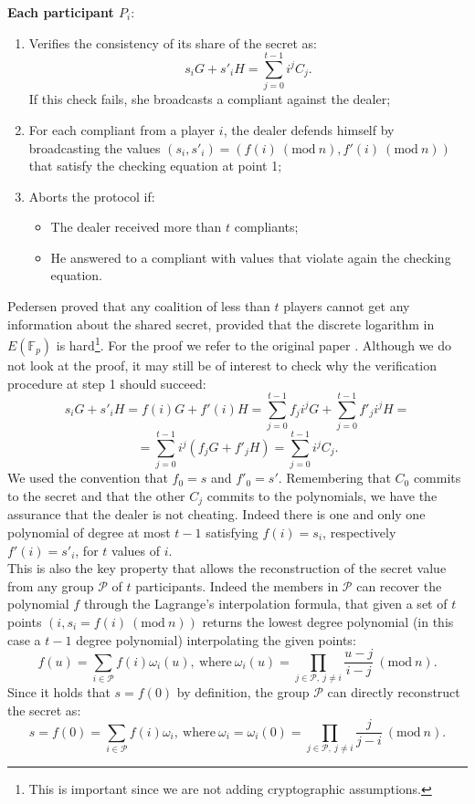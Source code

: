 \bigskip

\noindent
{\bf Each participant $P_i$}:
\begin{enumerate}
	\item Verifies the consistency of its share of the secret as:
	$$s_iG + s'_iH = \sum_{j = 0}^{t - 1}i^jC_j.$$
	If this check fails, she broadcasts a compliant against the dealer;
	\item For each compliant from a player $i$, the dealer defends himself by broadcasting the values $(s_i, s'_i) = (f(i) \ (\text{mod} \ n), f'(i) \ (\text{mod} \ n))$ that satisfy the checking equation at point 1;
	\item Aborts the protocol if:
	\begin{itemize}
		\item The dealer received more than $t$ compliants;
		\item He answered to a compliant with values that violate again the checking equation.
	\end{itemize}
\end{enumerate}
Pedersen proved that any coalition of less than $t$ players cannot get any information about the shared secret, provided that the discrete logarithm in $E(\mathbb{F}_p)$ is hard\footnote{This is important since we are not adding cryptographic assumptions.}. For the proof we refer to the original paper \cite{RefWork:13}. Although we do not look at the proof, it may still be of interest to check why the verification procedure at step 1 should succeed:
$$s_iG+ s'_iH = f(i)G + f'(i)H = \sum_{j = 0}^{t- 1}f_ji^jG + \sum_{j = 0}^{t - 1}f'_ji^jH =$$
$$= \sum_{j = 0}^{t - 1}i^j(f_jG + f'_jH)= \sum_{j = 0}^{t - 1}i^jC_j.$$
We used the convention that $f_0 = s$ and $f'_0 = s'$. Remembering that $C_0$ commits to the secret and that the other $C_j$ commits to the polynomials, we have the assurance that the dealer is not cheating. Indeed there is one and only one polynomial of degree at most $t - 1$ satisfying $f(i) = s_i$, respectively $f'(i) = s'_i$, for $t$ values of $i$. 
\\
This is also the key property that allows the reconstruction of the secret value from any group $\mathcal{P}$ of $t$ participants. Indeed the members in $\mathcal{P}$ can recover the polynomial $f$ through the Lagrange's interpolation formula, that given a set of $t$ points $(i, s_i = f(i) \ (\text{mod} \ n))$ returns the lowest degree polynomial (in this case a $t - 1$ degree polynomial) interpolating the given points:
$$f(u) = \sum_{i \in \mathcal{P}}f(i)\omega_i(u), \ \text{where} \ \omega_i(u) = \prod_{j \in \mathcal{P}, \ j \neq i}\frac{u - j}{i - j} \ (\text{mod} \ n).$$
Since it holds that $s = f(0)$ by definition, the group $\mathcal{P}$ can directly reconstruct the secret as:
$$s = f(0) = \sum_{i \in \mathcal{P}}f(i)\omega_i,  \ \text{where} \ \omega_i = \omega_i(0) = \prod_{j \in \mathcal{P}, \ j \neq i}\frac{j}{j - i} \ (\text{mod} \ n).$$

